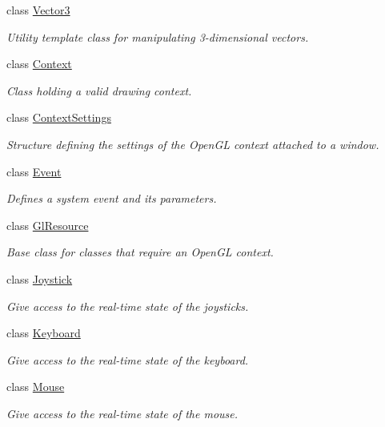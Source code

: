 \begin{DoxyCompactItemize}
class \hyperlink{classsf_1_1_vector3}{Vector3}
\begin{DoxyCompactList}\small\item\em Utility template class for manipulating 3-\/dimensional vectors. \end{DoxyCompactList}\item 
class \hyperlink{classsf_1_1_context}{Context}
\begin{DoxyCompactList}\small\item\em Class holding a valid drawing context. \end{DoxyCompactList}\item 
class \hyperlink{structsf_1_1_context_settings}{Context\-Settings}
\begin{DoxyCompactList}\small\item\em Structure defining the settings of the Open\-G\-L context attached to a window. \end{DoxyCompactList}\item 
class \hyperlink{classsf_1_1_event}{Event}
\begin{DoxyCompactList}\small\item\em Defines a system event and its parameters. \end{DoxyCompactList}\item 
class \hyperlink{classsf_1_1_gl_resource}{Gl\-Resource}
\begin{DoxyCompactList}\small\item\em Base class for classes that require an Open\-G\-L context. \end{DoxyCompactList}\item 
class \hyperlink{classsf_1_1_joystick}{Joystick}
\begin{DoxyCompactList}\small\item\em Give access to the real-\/time state of the joysticks. \end{DoxyCompactList}\item 
class \hyperlink{classsf_1_1_keyboard}{Keyboard}
\begin{DoxyCompactList}\small\item\em Give access to the real-\/time state of the keyboard. \end{DoxyCompactList}\item 
class \hyperlink{classsf_1_1_mouse}{Mouse}
\begin{DoxyCompactList}\small\item\em Give access to the real-\/time state of the mouse. \end{DoxyCompactList}\item 

\end{DoxyCompactItemize}
